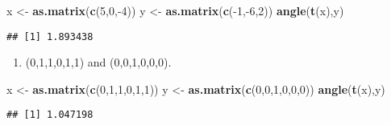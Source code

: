 \documentclass[]{article}
\newenvironment{Shaded}{\begin{snugshade}}{\end{snugshade}}
\newcommand{\KeywordTok}[1]{\textcolor[rgb]{0.13,0.29,0.53}{\textbf{{#1}}}}
\newcommand{\DecValTok}[1]{\textcolor[rgb]{0.00,0.00,0.81}{{#1}}}
\newcommand{\StringTok}[1]{\textcolor[rgb]{0.31,0.60,0.02}{{#1}}}
\newcommand{\NormalTok}[1]{{#1}}
\begin{document}
\begin{Shaded}
\begin{Highlighting}[]
\NormalTok{x <-}\StringTok{ }\KeywordTok{as.matrix}\NormalTok{(}\KeywordTok{c}\NormalTok{(}\DecValTok{5}\NormalTok{,}\DecValTok{0}\NormalTok{,-}\DecValTok{4}\NormalTok{))}
\NormalTok{y <-}\StringTok{ }\KeywordTok{as.matrix}\NormalTok{(}\KeywordTok{c}\NormalTok{(-}\DecValTok{1}\NormalTok{,-}\DecValTok{6}\NormalTok{,}\DecValTok{2}\NormalTok{))}
\KeywordTok{angle}\NormalTok{(}\KeywordTok{t}\NormalTok{(x),y)}
\end{Highlighting}
\end{Shaded}

\begin{verbatim}
## [1] 1.893438
\end{verbatim}

\begin{enumerate}
\def\labelenumi{(\alph{enumi})}
\setcounter{enumi}{3}
\itemsep1pt\parskip0pt
\item
  (0,1,1,0,1,1) and (0,0,1,0,0,0).
\end{enumerate}

\begin{Shaded}
\begin{Highlighting}[]
\NormalTok{x <-}\StringTok{ }\KeywordTok{as.matrix}\NormalTok{(}\KeywordTok{c}\NormalTok{(}\DecValTok{0}\NormalTok{,}\DecValTok{1}\NormalTok{,}\DecValTok{1}\NormalTok{,}\DecValTok{0}\NormalTok{,}\DecValTok{1}\NormalTok{,}\DecValTok{1}\NormalTok{))}
\NormalTok{y <-}\StringTok{ }\KeywordTok{as.matrix}\NormalTok{(}\KeywordTok{c}\NormalTok{(}\DecValTok{0}\NormalTok{,}\DecValTok{0}\NormalTok{,}\DecValTok{1}\NormalTok{,}\DecValTok{0}\NormalTok{,}\DecValTok{0}\NormalTok{,}\DecValTok{0}\NormalTok{))}
\KeywordTok{angle}\NormalTok{(}\KeywordTok{t}\NormalTok{(x),y)}
\end{Highlighting}
\end{Shaded}

\begin{verbatim}
## [1] 1.047198
\end{verbatim}
\end{document}
